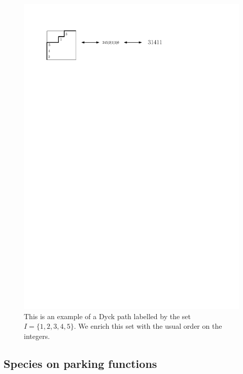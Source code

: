 \documentclass[12pt, reqno]{amsart}
\theoremstyle{definition}
\begin{document}
\begin{figure}
    \centering
    \includegraphics{images/correspondence_parking.pdf}
    \caption{This is an example of a Dyck path labelled by the set $I =\{1, 2, 3, 4, 5\}$. We enrich this set with the usual order on the integers.}
    \label{fig:construction_parking}
\end{figure}


\subsection{Species on parking functions}
\end{document}

